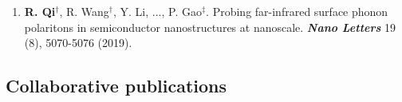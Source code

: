 \documentclass[11pt,sans]{moderncv}
\newcommand{\myemph}[1]{\textbf{\textit{#1}}}
\newcommand{\myname}[1]{\textbf{#1}}
\newcommand{\mylink}[1]{\href{#1}{\color{mycolor}\faLink}}
\begin{document}
\begin{enumerate}[topsep=2pt,itemsep=1ex,partopsep=1ex,parsep=1ex,leftmargin=6.35em]

	\item \myname{R. Qi}$^\dag$, R. Wang$^\dag$, Y. Li, ..., P. Gao$^\ddag$. 
	Probing far-infrared surface phonon polaritons in semiconductor nanostructures at nanoscale. 
	\myemph{Nano Letters} {19} (8), 5070-5076 (2019). 
	\mylink{https://pubs.acs.org/doi/10.1021/acs.nanolett.9b01350}


	\end{enumerate}
\ifshortcv
\else
\subsection{Collaborative publications}
\end{document}
